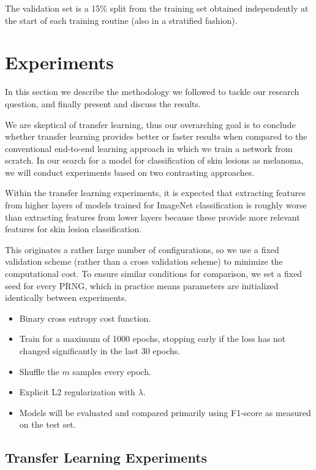 The validation set is a 15\% split from the training set obtained independently at the start of each training routine (also in a stratified fashion).

\chapter{Experiments}
\label{chapter:experiments}

In this section we describe the methodology we followed to tackle our research question, and finally present and discuss the results.

We are skeptical of transfer learning, thus our overarching goal is to conclude whether transfer learning provides better or faster results when compared to the conventional end-to-end learning approach in which we train a network from scratch. In our search for a model for classification of skin lesions as melanoma, we will conduct experiments based on two contrasting approaches.

Within the transfer learning experiments, it is expected that extracting features from higher layers of models trained for ImageNet\cite{imagenet} classification is roughly worse than extracting features from lower layers because these provide more relevant features for skin lesion classification.

This originates a rather large number of configurations, so we use a fixed validation scheme (rather than a cross validation scheme) to minimize the computational cost. To ensure similar conditions for comparison, we set a fixed seed for every \ac{PRNG}, which in practice means parameters are initialized identically between experiments.

\begin{itemize}
    \item Binary cross entropy cost function.
    \item Train for a maximum of 1000 epochs, stopping early if the loss has not changed significantly in the last $30$ epochs.
    \item Shuffle the $m$ samples every epoch.
    \item Explicit L2 regularization with $\lambda$.
    \item Models will be evaluated and compared primarily using F1-score as measured on the test set.
\end{itemize}

\section{Transfer Learning Experiments}

